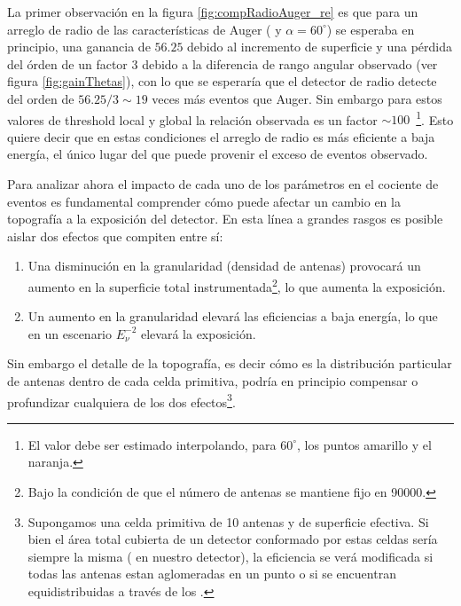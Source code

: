 	La primer observaci\'on en la figura \ref{fig:compRadioAuger_re} es que para un arreglo de radio de las caracter\'isticas de Auger ( y $\alpha=60^\circ$) se esperaba en principio, una ganancia de $56.25$ debido al incremento de superficie y una p\'erdida del \'orden de un factor $3$ debido a la diferencia de rango angular observado (ver figura \ref{fig:gainThetas}), con lo que se esperar\'ia que el detector de radio detecte del orden de $56.25/3\sim19$ veces m\'as eventos que Auger. 
	Sin embargo para estos valores de threshold local y global la relaci\'on observada es un factor $\sim100$~\footnote{El valor debe ser estimado interpolando, para $60^\circ$, los puntos amarillo y el naranja.}.
	Esto quiere decir que en estas condiciones el arreglo de radio es m\'as eficiente a baja energ\'ia, el \'unico lugar del que puede provenir el exceso de eventos observado.
	
	Para analizar ahora el impacto de cada uno de los par\'ametros en el cociente de eventos es fundamental comprender c\'omo puede afectar un cambio en la topograf\'ia a la exposici\'on del detector. En esta l\'inea a grandes rasgos es posible aislar dos efectos que compiten entre s\'i:
	\begin{enumerate}
	 \item Una disminuci\'on en la granularidad (densidad de antenas) provocar\'a un aumento en la superficie total instrumentada\footnote{Bajo la condici\'on de que el n\'umero de antenas se mantiene fijo en 90000.}, lo que aumenta la exposici\'on.
	 \item Un aumento en la granularidad elevar\'a las eficiencias a baja energ\'ia, lo que en un escenario $E_\nu^{-2}$ elevar\'a la exposici\'on.
	\end{enumerate}
	Sin embargo el detalle de la topograf\'ia, es decir c\'omo es la distribuci\'on particular de antenas dentro de cada celda primitiva, podr\'ia en principio compensar o profundizar cualquiera de los dos efectos\footnote{Supongamos una celda primitiva de 10 antenas y  de superficie efectiva. Si bien el \'area total cubierta de un detector conformado por estas celdas ser\'ia siempre la misma ( en nuestro detector), la eficiencia se ver\'a modificada si todas las antenas estan aglomeradas en un punto o si se encuentran equidistribuidas a trav\'es de los .}.
	
